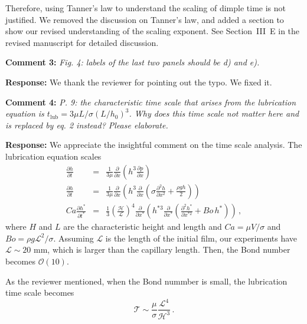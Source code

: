 \documentclass[11pt]{article}
\newif\ifhighlight
\newcommand{\hl}[1]{\ifhighlight\textcolor{blue}{#1}\else#1\fi}
\begin{document}
\hl{
Therefore, using Tanner’s law to understand the scaling of dimple time is not justified. 
We removed the discussion on Tanner’s law, and added a section to show our revised understanding of the scaling exponent. 
See Section~III~E in the revised manuscript for detailed discussion.
}

\bigskip
\begin{siderules}
\textbf{Comment 3:} \textit{Fig. 4: labels of the last two panels should be d) and e).}
\end{siderules}

\textbf{Response:} We thank the reviewer for pointing out the typo. We fixed it. 

\bigskip
\begin{siderules}
\textbf{Comment 4:} \textit{P. 9: the characteristic time scale that arises from the lubrication equation is $t_\mathrm{lub}=3 \mu L/ \sigma  (L/h_0)^3$. Why does this time scale not matter here and is replaced by eq. 2 instead? Please elaborate.}
\end{siderules}

\textbf{Response:} We appreciate the insightful comment on the time scale analysis. 
The lubrication equation scales
\begin{eqnarray}
        \frac{\partial h}{\partial t} &=& \frac{1}{3\mu} \frac{\partial}{\partial x} \left( h^3 \frac{\partial p}{\partial x} \right) \\
        \frac{\partial h}{\partial t} &=& \frac{1}{3\mu} \frac{\partial}{\partial x} \left( h^3 \frac{\partial }{\partial x} \left( \sigma \frac{\partial^2 h}{\partial x^{2}} + \frac{\rho g h}{2} \right) \right) \\   
        Ca \frac{\partial h^*}{\partial t^*} &=& \frac{1}{3} \left(\frac{\mathcal{H}}{\mathcal{L}}\right)^4 \frac{\partial}{\partial x^*} \left( h^{*3} \frac{\partial }{\partial x^*} \left( \frac{\partial^2 h^*}{\partial x^{*2}} + Bo \, {h^*} \right) \right) \, ,        
\end{eqnarray}
where $H$ and $L$ are the characteristic height and length and $Ca = \mu V/\sigma$ and $Bo = \rho g \mathcal{L}^2 /\sigma$. Assuming $\mathcal{L}$ is the length of the initial film, our experiments have $\mathcal{L} \sim 20$ mm, which is larger than the capillary length. Then, the Bond number becomes $\mathcal{O} (10)$. 

As the reviewer mentioned, when the Bond nummber is small, the lubrication time scale becomes  
\begin{equation}
    \mathcal{T} \sim \frac{\mu}{\sigma} \frac{\mathcal{L}^4}{\mathcal{H}^3} \,.
\end{equation}
\end{document}
